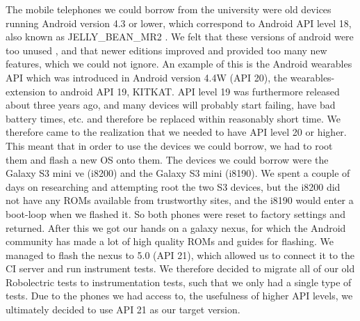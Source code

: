 The mobile telephones we could borrow from the university were old devices running Android version 4.3 or lower, which correspond to Android API level 18, also known as JELLY\_BEAN\_MR2 \parencite{uses_sdk}. We felt that these versions of android were too unused \parencite{android_dashboard}, and that newer editions improved and provided too many new features, which we could not ignore. An example of this is the Android wearables API which was introduced in Android version 4.4W (API 20), the wearables-extension to android API 19, KITKAT. API level 19 was furthermore released about three years ago, and many devices will probably start failing, have bad battery times, etc. and therefore be replaced within reasonably short time. We therefore came to the realization that we needed to have API level 20 or higher. This meant that in order to use the devices we could borrow, we had to root them and flash a new OS onto them. The devices we could borrow were the Galaxy S3 mini ve (i8200) and the Galaxy S3 mini (i8190). We spent a couple of days on researching and attempting root the two S3 devices, but the i8200 did not have any ROMs available from trustworthy sites, and the i8190 would enter a boot-loop when we flashed it. So both phones were reset to factory settings and returned. After this we got our hands on a galaxy nexus, for which the Android community has made a lot of high quality ROMs and guides for flashing. We managed to flash the nexus to 5.0 (API 21), which allowed us to connect it to the CI server and run instrument tests. We therefore decided to migrate all of our old Robolectric tests to instrumentation tests, such that we only had a single type of tests. Due to the phones we had access to, the usefulness of higher API levels, we ultimately decided to use API 21 as our target version. 

